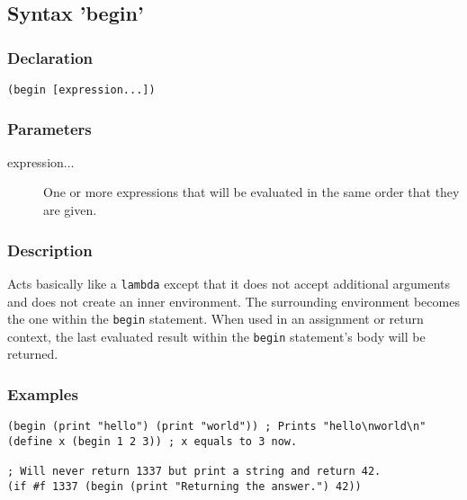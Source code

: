 \subsection{Syntax 'begin'}
\label{builtins/begin}

\subsubsection*{Declaration}
\begin{lstlisting}
(begin [expression...])
\end{lstlisting}

\subsubsection*{Parameters}
\begin{description}
	\item[expression...] One or more expressions that will be evaluated in the same order that they are given.
\end{description}

\subsubsection*{Description}
Acts basically like a \lstinline|lambda| except that it does not accept additional arguments and does not create an inner environment. The surrounding environment becomes the one within the \lstinline|begin| statement. When used in an assignment or return context, the last evaluated result within the \lstinline|begin| statement's body will be returned.

\subsubsection*{Examples}
\begin{lstlisting}
(begin (print "hello") (print "world")) ; Prints "hello\nworld\n"
(define x (begin 1 2 3)) ; x equals to 3 now.

; Will never return 1337 but print a string and return 42.
(if #f 1337 (begin (print "Returning the answer.") 42))
\end{lstlisting}
